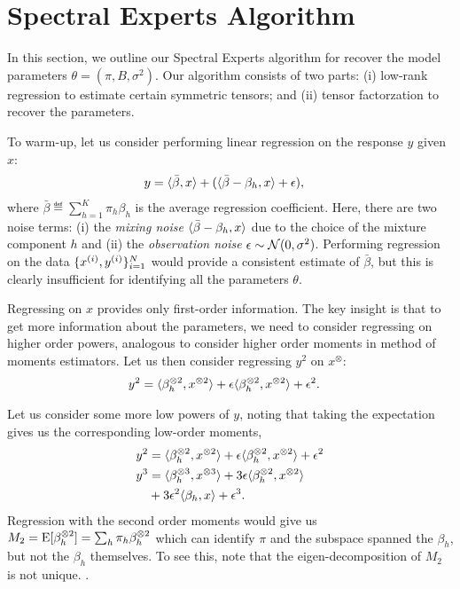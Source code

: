 \section{Spectral Experts Algorithm}
\label{sec:algo}

In this section, we outline our Spectral Experts algorithm
for recover the model parameters $\theta = (\pi, B, \sigma^2)$.
Our algorithm consists of two parts:
(i) low-rank regression to estimate certain symmetric tensors;
and (ii) tensor factorzation to recover the parameters.

To warm-up, let us consider performing linear regression
on the response $y$ given $x$:
\begin{align}
  y &= \langle \bar \beta, x \rangle + (\langle \bar\beta - \beta_h, x \rangle + \epsilon),
\end{align}
where $\bar\beta \eqdef \sum_{h=1}^K \pi_h \beta_h$ is the average regression coefficient.
Here, there are two noise terms:
(i) the \emph{mixing noise} $\langle \bar\beta - \beta_h, x \rangle$
due to the choice of the mixture component $h$
and (ii) the \emph{observation noise} $\epsilon \sim \mathcal{N}(0, \sigma^2)$.
Performing regression on the data $\{x^{(i)},
y^{(i)}\}_{i=1}^{N}$ would provide a consistent estimate of $\bar\beta$,
but this is clearly insufficient for identifying all the parameters $\theta$.

Regressing on $x$ provides only first-order
information.  The key insight is that to get more information about the
parameters, we need to consider regressing on higher order powers,
analogous to consider higher order moments in method of moments estimators.
Let us then consider regressing $y^2$ on $x^\otimes$:
\begin{align}
  y^2 &= \langle \beta_h^{\otimes 2}, x^{\otimes 2} \rangle + \epsilon \langle \beta_h^{\otimes 2}, x^{\otimes 2} \rangle + \epsilon^2 \label{eq:y2}.
\end{align}

Let us consider some more low powers of $y$, noting
that taking the expectation gives us the corresponding low-order
moments,
\begin{align}
  y^2 &= \langle \beta_h^{\otimes 2}, x^{\otimes 2} \rangle + \epsilon \langle \beta_h^{\otimes 2}, x^{\otimes 2} \rangle + \epsilon^2 \label{eq:y2} \\ 
  y^3 &= \langle \beta_h^{\otimes 3}, x^{\otimes 3} \rangle + 3 \epsilon \langle \beta_h^{\otimes 2}, x^{\otimes 2} \rangle \notag \\
  &+ 3 \epsilon^2 \langle \beta_h, x \rangle + \epsilon^3. \label{eq:y3} 
\end{align}
Regression with the second order moments would give us $M_2 = \operatorname{E}[\beta_h
^{\otimes 2}] = \sum_h \pi_h \beta_h^{\otimes 2}$ which can identify $\pi$ and the
subspace spanned the $\beta_h$, but not the $\beta_h$ themselves. To see
this, note that the eigen-decomposition of $M_2$ is not unique.
.

